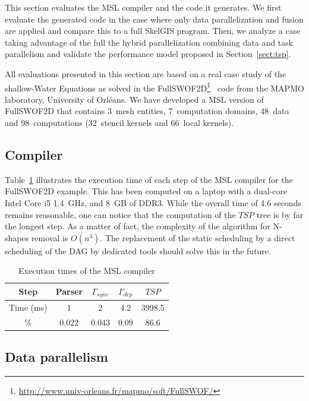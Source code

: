 This section evaluates the MSL compiler and the code it generates.
We first evaluate the generated code in the case where only data parallelization and fusion are applied and compare this to a full SkelGIS program.
Then, we analyze a case taking advantage of the full the hybrid parallelization combining data and task parallelism and validate the performance model proposed in Section~\ref{sect:tsp}.

All evaluations presented in this section are based on a real case study of the shallow-Water Equations as solved in  the FullSWOF2D\footnote{\url{http://www.univ-orleans.fr/mapmo/soft/FullSWOF/}}~\cite{Ferrari2004,CPE:CPE3494} code from the MAPMO laboratory, University of Orl\'eans.
We have developed a MSL version of FullSWOF2D that contains 3~mesh entities, 7~computation domains, 48~data and 98~computations (32~stencil kernels and 66~local kernels).

\subsection{Compiler}

Table~\ref{fig:exectime} illustrates the execution time of each step of the MSL compiler for the FullSWOF2D example.
This has been computed on a laptop with a dual-core Intel Core i5 1.4~GHz, and 8~GB of DDR3.
While the overall time of 4.6 seconds remains reasonable, one can notice that the computation of the $TSP$ tree is by far the longest step.
As a matter of fact, the complexity of the algorithm for N-shapes removal is $O(n^3)$.
The replacement of the static scheduling by a direct scheduling of the DAG by dedicated tools should solve this in the future.

\begin{table}[!h]
 \begin{center}
 \begin{tabular}{|c|c|c|c|c|}
  \hline
   Step & Parser & $\Gamma_{sync}$ & $\Gamma_{dep}$ & $TSP$\\
   \hline
   Time (ms) & 1 & 2 & 4.2 & 3998.5\\
   \hline
   \% & 0.022 & 0.043 & 0.09 & 86.6\\
   \hline
 \end{tabular}
\caption{Execution times of the MSL compiler}
\label{fig:exectime}
 \end{center}
\end{table}

\subsection{Data parallelism}

